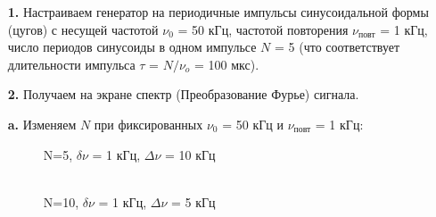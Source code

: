 \documentclass[a4paper,12pt]{article}
\begin{document}
\begin{enumerate}
\item [\textbf{1.}] Настраиваем генератор на периодичные импульсы синусоидальной формы (цугов) с несущей частотой $\nu_0$ = 50 кГц, частотой повторения $\nu_\text{повт}$ = 1 кГц, число периодов синусоиды в одном импульсе $N$ = 5 (что соответствует длительности импульса $\tau$ = $N/\nu_o$ = 100 мкс).

\item [\textbf{2.}] Получаем на экране спектр (Преобразование Фурье) сигнала.

\textbf{a.} Изменяем $N$ при фиксированных $\nu_0$ = 50 кГц и $\nu_\text{повт}$ = 1 кГц:

\begin{figure}[h]
\begin{minipage}[h]{0.47\linewidth}
 N=5, $\delta \nu$ = 1 кГц, $\Delta \nu$ = 10 кГц\\
\end{minipage}
\hfill
\begin{minipage}[h]{0.47\linewidth}
 \\N=10, $\delta \nu$ = 1 кГц, $\Delta \nu$ = 5 кГц

\end{minipage}
\end{figure}
\end{enumerate}
\end{document}
